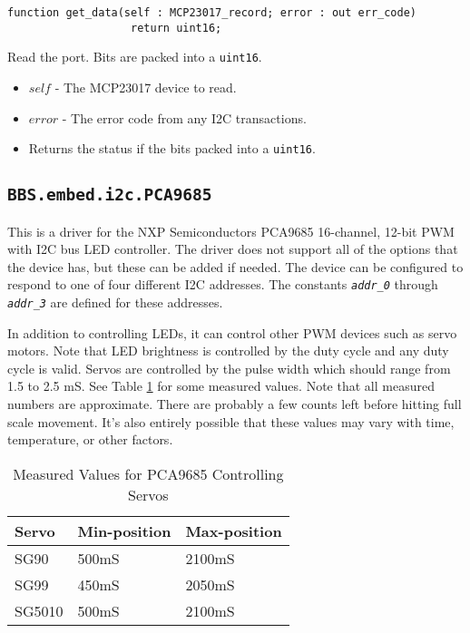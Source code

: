 \documentclass[10pt, openany]{book}
\newcommand{\indexfunc}[1]{\index[func]{#1}}
\newcommand{\package}[1]{\texttt{#1}}
\newcommand{\constant}[1]{\emph{\texttt{#1}}}
\newcommand{\datatype}[1]{\texttt{#1}}
\begin{document}
\begin{lstlisting}
function get_data(self : MCP23017_record; error : out err_code)
                   return uint16;
\end{lstlisting}
\indexfunc{get\_data}
Read the port.  Bits are packed into a \datatype{uint16}.
\begin{itemize}
  \item $self$ - The MCP23017 device to read.
  \item $error$ - The error code from any I2C transactions.
  \item Returns the status if the bits packed into a \datatype{uint16}.
\end{itemize}

\subsection{\package{BBS.embed.i2c.PCA9685}}
This is a driver for the NXP Semiconductors PCA9685 16-channel, 12-bit PWM with I2C bus LED controller\cite{PCA9685}.  The driver does not support all of the options that the device has, but these can be added if needed.  The device can be configured to respond to one of four different I2C addresses.  The constants \constant{addr\_0} through \constant{addr\_3} are defined for these addresses.

In addition to controlling LEDs, it can control other PWM devices such as servo motors.  Note that LED brightness is controlled by the duty cycle and any duty cycle is valid.  Servos are controlled by the pulse width which should range from 1.5 to 2.5 mS.  See Table \ref{tbl:PCA9685Servo} for some measured values.  Note that all measured numbers are approximate.  There are probably a few  counts left before hitting full scale movement.  It's also entirely possible  that these values may vary with time, temperature, or other factors.

\begin{table}[!h]
\begin{center}
  \begin{tabular}{l|l|l}
    Servo & Min-position & Max-position \\
    \hline
    SG90 & 500mS & 2100mS \\
    SG99 & 450mS & 2050mS \\
    SG5010 & 500mS & 2100mS \\
  \end{tabular}
  \caption{Measured Values for PCA9685 Controlling Servos}
  \label{tbl:PCA9685Servo}
\end{center}
\end{table}
\end{document}
